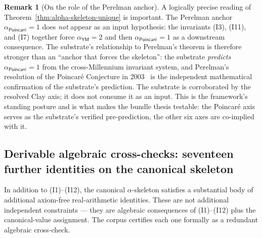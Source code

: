 \documentclass[11pt,a4paper]{amsart}
\theoremstyle{plain}
\theoremstyle{definition}
\newtheorem{remark}[theorem]{Remark}
\begin{document}
\begin{remark}[On the role of the Perelman anchor]\label{rem:perelman-role}
A logically precise reading of Theorem~\ref{thm:alpha-skeleton-unique} is important. The Perelman anchor $\alpha_{\textsf{Poincar\'e}} = 1$ does \emph{not} appear as an input hypothesis: the invariants (I3), (I11), and (I7) together force $\alpha_{\textsf{YM}} = 2$ and then $\alpha_{\textsf{Poincar\'e}} = 1$ as a downstream consequence. The substrate's relationship to Perelman's theorem is therefore stronger than an ``anchor that forces the skeleton'': the substrate \emph{predicts} $\alpha_{\textsf{Poincar\'e}} = 1$ from the cross-Millennium invariant system, and Perelman's resolution of the Poincar\'e Conjecture in 2003~\cite{perelman2003} is the independent mathematical confirmation of the substrate's prediction. The substrate is corroborated by the resolved Clay axis; it does not consume it as an input. This is the framework's standing posture and is what makes the bundle thesis testable: the Poincar\'e axis serves as the substrate's verified pre-prediction, the other six axes are co-implied with it.
\end{remark}

\subsection{Derivable algebraic cross-checks: seventeen further identities on the canonical skeleton}\label{subsec:cross-checks}

In addition to (I1)--(I12), the canonical $\alpha$-skeleton satisfies a substantial body of additional axiom-free real-arithmetic identities. These are not additional independent constraints --- they are algebraic consequences of (I1)--(I12) plus the canonical-value assignment. The corpus certifies each one formally as a redundant algebraic cross-check.
\end{document}
